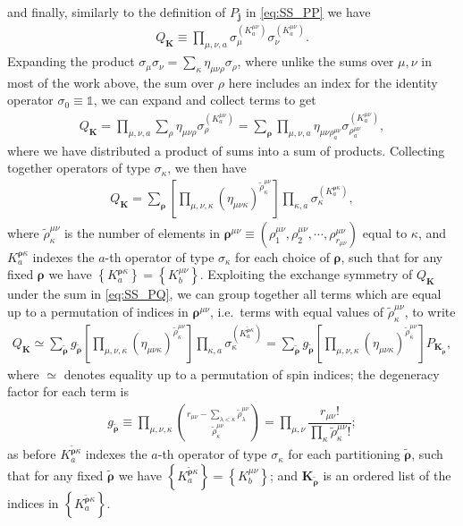 \documentclass[aps,notitlepage,nofootinbib,11pt]{revtex4-1}
\newcommand{\f}[2]{\dfrac{#1}{#2}} %
\newcommand{\p}[1]{\left(#1\right)} %
\renewcommand{\sp}[1]{\left[#1\right]} %
\renewcommand{\set}[1]{\left\{#1\right\}} %
\renewcommand{\v}{\bm} %
\newcommand{\1}{\mathds{1}}
\begin{document}
and finally, similarly to the definition of $P_{\v j}$ in
\eqref{eq:SS_PP} we have
\begin{align}
  Q_{\v K} \equiv \prod_{\mu,\nu,a}
  \sigma_\mu^{(K^{\mu\nu}_a)} \sigma_\nu^{(K^{\mu\nu}_a)}.
\end{align}
Expanding the product
$\sigma_\mu\sigma_\nu=\sum_\kappa\eta_{\mu\nu\rho}\sigma_\rho$, where
unlike the sums over $\mu,\nu$ in most of the work above, the sum over
$\rho$ here includes an index for the identity operator
$\sigma_0\equiv\1$, we can expand and collect terms to get
\begin{align}
  Q_{\v K}
  = \prod_{\mu,\nu,a} \sum_\rho
  \eta_{\mu\nu\rho} \sigma_\rho^{(K^{\mu\nu}_a)}
  = \sum_{\v\rho} \prod_{\mu,\nu,a} \eta_{\mu\nu\rho^{\mu\nu}_a}
  \sigma_{\rho^{\mu\nu}_a}^{(K^{\mu\nu}_a)},
\end{align}
where we have distributed a product of sums into a sum of products.
Collecting together operators of type $\sigma_\kappa$, we then have
\begin{align}
  Q_{\v K}
  = \sum_{\v\rho} \sp{\prod_{\mu,\nu,\kappa}
    \p{\eta_{\mu\nu\kappa}}^{\tilde\rho^{\mu\nu}_\kappa}}
  \prod_{\kappa,a} \sigma_{\kappa}^{(K^{\v\rho\kappa}_a)},
\end{align}
where $\tilde\rho_\kappa^{\mu\nu}$ is the number of elements in
$\v\rho^{\mu\nu} \equiv
\p{\rho^{\mu\nu}_1,\rho^{\mu\nu}_2,\cdots,\rho^{\mu\nu}_{r_{\mu\nu}}}$
equal to $\kappa$, and $K^{\v\rho\kappa}_a$ indexes the $a$-th
operator of type $\sigma_\kappa$ for each choice of $\v\rho$, such
that for any fixed $\v\rho$ we have
$\set{K^{\v\rho\kappa}_a}=\set{K^{\mu\nu}_b}$.  Exploiting the
exchange symmetry of $Q_{\v K}$ under the sum in \eqref{eq:SS_PQ}, we
can group together all terms which are equal up to a permutation of
indices in $\v\rho^{\mu\nu}$, i.e.~terms with equal values of
$\tilde\rho_\kappa^{\mu\nu}$, to write
\begin{align}
  Q_{\v K}
  \simeq \sum_{\tilde{\v\rho}}
  g_{\tilde{\v\rho}} \sp{\prod_{\mu,\nu,\kappa}
    \p{\eta_{\mu\nu\kappa}}^{\tilde\rho^{\mu\nu}_\kappa}}
  \prod_{\kappa,a} \sigma_{\kappa}^{(K^{\tilde{\v\rho}\kappa}_a)}
  = \sum_{\tilde{\v\rho}} g_{\tilde{\v\rho}}
  \sp{\prod_{\mu,\nu,\kappa}
    \p{\eta_{\mu\nu\kappa}}^{\tilde\rho^{\mu\nu}_\kappa}}
  P_{\v K_{\tilde{\v\rho}}},
\end{align}
where $\simeq$ denotes equality up to a permutation of spin indices;
the degeneracy factor for each term is
\begin{align}
  g_{\tilde{\v\rho}}
  \equiv \prod_{\mu,\nu,\kappa}
  { r_{\mu\nu} - \sum_{\lambda<\kappa} \tilde\rho^{\mu\nu}_\lambda
    \choose \tilde\rho^{\mu\nu}_\kappa }
  = \prod_{\mu,\nu}
  \f{r_{\mu\nu}!}{\prod_\kappa\tilde\rho^{\mu\nu}_\kappa!};
\end{align}
as before $K^{\tilde{\v\rho}\kappa}_a$ indexes the $a$-th operator of
type $\sigma_\kappa$ for each partitioning $\tilde{\v\rho}$, such that
for any fixed $\tilde{\v\rho}$ we have
$\set{K^{\tilde{\v\rho}\kappa}_a}=\set{K^{\mu\nu}_b}$; and
$\v K_{\tilde{\v\rho}}$ is an ordered list of the indices in
$\set{K^{\tilde{\v\rho}\kappa}_a}$.
\end{document}

